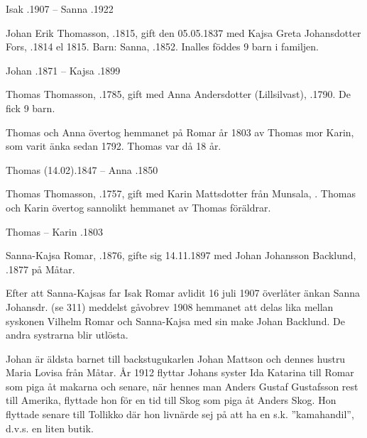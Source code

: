 Isak .1907  --  Sanna .1922


Johan Erik Thomasson, .1815, gift den 05.05.1837 med Kajsa Greta Johansdotter Fors, .1814 el 1815.
Barn: Sanna, .1852. Inalles föddes 9 barn i familjen.

Johan .1871  --  Kajsa .1899


Thomas Thomasson, .1785, gift med Anna Andersdotter (Lillsilvast), .1790. De fick 9 barn.
\begin{jhchildren}
  \item {}
  \item {}
\end{jhchildren}
Thomas och Anna övertog hemmanet på Romar år 1803 av Thomas mor Karin, som varit änka sedan 1792. Thomas var då 18 år.

Thomas (14.02).1847  --  Anna .1850


Thomas Thomasson, .1757, gift med Karin Mattsdotter från Munsala, . Thomas och Karin övertog sannolikt hemmanet av Thomas föräldrar.
\begin{jhchildren}
  \item {}
  \item {}
\end{jhchildren}

Thomas   --  Karin .1803






Sanna-Kajsa Romar, .1876, gifte sig 14.11.1897 med Johan Johansson Backlund, .1877 på Måtar.

Efter att Sanna-Kajsas far Isak Romar avlidit 16 juli 1907 överlåter änkan Sanna Johansdr. (se 311) meddelst gåvobrev 1908 hemmanet att delas lika mellan syskonen Vilhelm Romar och Sanna-Kajsa med sin make Johan Backlund. De andra systrarna blir utlösta.

Johan är äldsta barnet till backstugukarlen Johan Mattson och dennes hustru Maria Lovisa från Måtar. År 1912 flyttar Johans syster Ida Katarina till Romar som piga åt makarna och senare, när hennes man Anders Gustaf Gustafsson rest till Amerika, flyttade hon för en tid
till Skog som piga åt Anders Skog. Hon flyttade senare till Tollikko där hon livnärde sej på att ha en s.k. ”kamahandil”, d.v.s. en liten butik.

